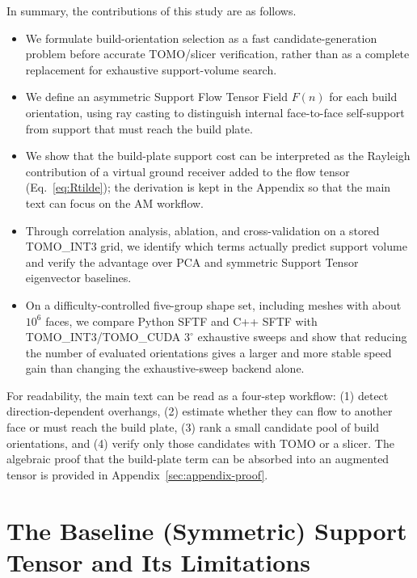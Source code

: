 \documentclass[11pt,a4paper]{article}
\begin{document}
In summary, the contributions of this study are as follows.
\begin{itemize}
\item We formulate build-orientation selection as a fast candidate-generation problem before accurate TOMO/slicer verification, rather than as a complete replacement for exhaustive support-volume search.
\item We define an asymmetric Support Flow Tensor Field $F(n)$ for each build orientation, using ray casting to distinguish internal face-to-face self-support from support that must reach the build plate.
\item We show that the build-plate support cost can be interpreted as the Rayleigh contribution of a virtual ground receiver added to the flow tensor (Eq.~\eqref{eq:Rtilde}); the derivation is kept in the Appendix so that the main text can focus on the AM workflow.
\item Through correlation analysis, ablation, and cross-validation on a stored TOMO\_INT3 grid, we identify which terms actually predict support volume and verify the advantage over PCA and symmetric Support Tensor eigenvector baselines.
\item On a difficulty-controlled five-group shape set, including meshes with about $10^6$ faces, we compare Python SFTF and C++ SFTF with TOMO\_INT3/TOMO\_CUDA $3^\circ$ exhaustive sweeps and show that reducing the number of evaluated orientations gives a larger and more stable speed gain than changing the exhaustive-sweep backend alone.
\end{itemize}

For readability, the main text can be read as a four-step workflow:
(1) detect direction-dependent overhangs,
(2) estimate whether they can flow to another face or must reach the build plate,
(3) rank a small candidate pool of build orientations, and
(4) verify only those candidates with TOMO or a slicer.
The algebraic proof that the build-plate term can be absorbed into an augmented tensor is provided in Appendix~\ref{sec:appendix-proof}.

\section{The Baseline (Symmetric) Support Tensor and Its Limitations}
\label{sec:support-tensor-limit}
\end{document}
